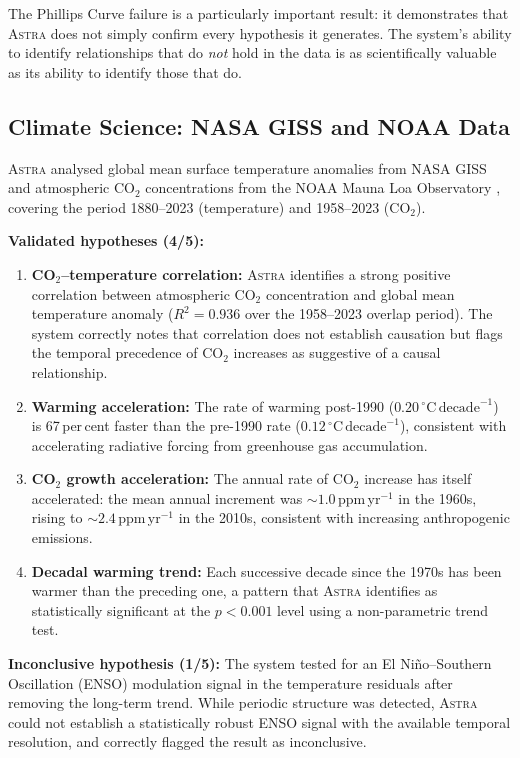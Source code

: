 \documentclass[usenatbib]{rasti}
\newcommand{\astra}{\textsc{Astra}\xspace}
\begin{document}
The Phillips Curve failure is a particularly important result: it demonstrates that \astra does not simply confirm every hypothesis it generates. The system's ability to identify relationships that do \emph{not} hold in the data is as scientifically valuable as its ability to identify those that do.

\subsection{Climate Science: NASA GISS and NOAA Data}
\label{sec:crossdomain:climate}

\astra analysed global mean surface temperature anomalies from NASA GISS \citep{Hansen2010} and atmospheric CO$_{2}$ concentrations from the NOAA Mauna Loa Observatory \citep{NOAA2024}, covering the period 1880--2023 (temperature) and 1958--2023 (CO$_{2}$).

\textbf{Validated hypotheses (4/5):}
\begin{enumerate}
  \item[(i)] \textbf{CO$_{2}$--temperature correlation:} \astra identifies a strong positive correlation between atmospheric CO$_{2}$ concentration and global mean temperature anomaly ($R^{2} = 0.936$ over the 1958--2023 overlap period). The system correctly notes that correlation does not establish causation but flags the temporal precedence of CO$_{2}$ increases as suggestive of a causal relationship.
  \item[(ii)] \textbf{Warming acceleration:} The rate of warming post-1990 ($0.20\,^{\circ}\mathrm{C}\,\mathrm{decade}^{-1}$) is 67\,per\,cent faster than the pre-1990 rate ($0.12\,^{\circ}\mathrm{C}\,\mathrm{decade}^{-1}$), consistent with accelerating radiative forcing from greenhouse gas accumulation.
  \item[(iii)] \textbf{CO$_{2}$ growth acceleration:} The annual rate of CO$_{2}$ increase has itself accelerated: the mean annual increment was ${\sim}1.0$\,ppm\,yr$^{-1}$ in the 1960s, rising to ${\sim}2.4$\,ppm\,yr$^{-1}$ in the 2010s, consistent with increasing anthropogenic emissions.
  \item[(iv)] \textbf{Decadal warming trend:} Each successive decade since the 1970s has been warmer than the preceding one, a pattern that \astra identifies as statistically significant at the $p < 0.001$ level using a non-parametric trend test.
\end{enumerate}

\textbf{Inconclusive hypothesis (1/5):}
The system tested for an El Ni\~{n}o--Southern Oscillation (ENSO) modulation signal in the temperature residuals after removing the long-term trend. While periodic structure was detected, \astra could not establish a statistically robust ENSO signal with the available temporal resolution, and correctly flagged the result as inconclusive.
\end{document}
